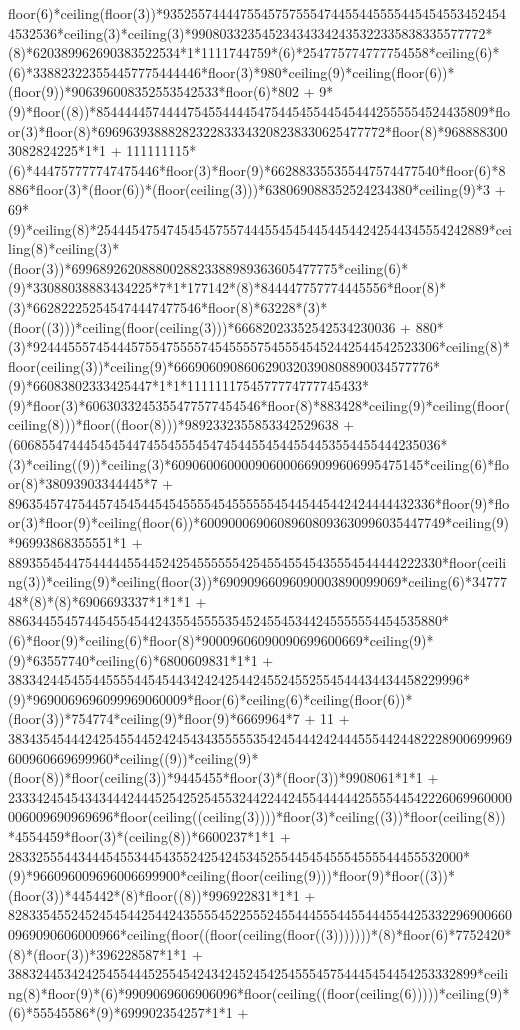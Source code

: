 floor(6)*ceiling(floor(3))*93525574444755457575554744554455554454545534524544532536*ceiling(3)*ceiling(3)*990803323545234343342435322335838335577772*(8)*620389962690383522534*1*1111744759*(6)*254775774777754558*ceiling(6)*(6)*338823223554457775444446*floor(3)*980*ceiling(9)*ceiling(floor(6))*(floor(9))*906396008352553542533*floor(6)*802 + 9*(9)*floor((8))*85444445744447545544445475445455445454442555554524435809*floor(3)*floor(8)*69696393888282322833343208238330625477772*floor(8)*9688883003082824225*1*1 + 111111115*(6)*444757777747475446*floor(3)*floor(9)*662883355355447574477540*floor(6)*8886*floor(3)*(floor(6))*(floor(ceiling(3)))*638069088352524234380*ceiling(9)*3 + 69*(9)*ceiling(8)*25444547547454545755744455454544544544242544345554242889*ceiling(8)*ceiling(3)*(floor(3))*69968926208880028823388989363605477775*ceiling(6)*(9)*33088038883434225*7*1*177142*(8)*844447757774445556*floor(8)*(3)*662822252545474447477546*floor(8)*63228*(3)*(floor((3)))*ceiling(floor(ceiling(3)))*66682023352542534230036 + 880*(3)*9244455574544457554755557454555575455545452442544542523306*ceiling(8)*floor(ceiling(3))*ceiling(9)*6669060908606290320390808890034577776*(9)*66083802333425447*1*1*1111111754577774777745433*(9)*floor(3)*6063033245355477577454546*floor(8)*883428*ceiling(9)*ceiling(floor(ceiling(8)))*floor((floor(8)))*9892332355853342529638 + (6068554744454545447455455545474544554544554453554455444235036*(3)*ceiling((9))*ceiling(3)*609060060000906000669099606995475145*ceiling(6)*floor(8)*38093903344445*7 + 8963545747544574545445454555545455555545445445442424444432336*floor(9)*floor(3)*floor(9)*ceiling(floor(6))*60090006906089608093630996035447749*ceiling(9)*96993868355551*1 + 88935545447544444554452425455555542545545545435554544444222330*floor(ceiling(3))*ceiling(9)*ceiling(floor(3))*69090966096090003890099069*ceiling(6)*3477748*(8)*(8)*6906693337*1*1*1 + 88634455457445455454424355455553545245545344245555554454535880*(6)*floor(9)*ceiling(6)*floor(8)*90009606090090699600669*ceiling(9)*(9)*63557740*ceiling(6)*6800609831*1*1 + 38334244545544555544545443424242544245524552554544434434458229996*(9)*9690069696099969060009*floor(6)*ceiling(6)*ceiling(floor(6))*(floor(3))*754774*ceiling(9)*floor(9)*6669964*7 + 11 + 383435454442425455445242454343555553542454442424445554424482228900699969600960669699960*ceiling((9))*ceiling(9)*(floor(8))*floor(ceiling(3))*9445455*floor(3)*(floor(3))*9908061*1*1 + 233342454543434442444525425254553244224424554444442555544542226069960000006009690969696*floor(ceiling((ceiling(3))))*floor(3)*ceiling((3))*floor(ceiling(8))*4554459*floor(3)*(ceiling(8))*6600237*1*1 + 28332555443444545534454355242542453452554454545554555544455532000*(9)*966096009696006699900*ceiling(floor(ceiling(9)))*floor(9)*floor((3))*(floor(3))*445442*(8)*floor((8))*996922831*1*1 + 8283354552452454544254424355554522555245544455544554445544253322969006600969090606000966*ceiling(floor((floor(ceiling(floor((3)))))))*(8)*floor(6)*7752420*(8)*(floor(3))*396228587*1*1 + 3883244534242545544452554542434245245425455545754445454454253332899*ceiling(8)*floor(9)*(6)*9909069606906096*floor(ceiling((floor(ceiling(6)))))*ceiling(9)*(6)*55545586*(9)*699902354257*1*1 + 